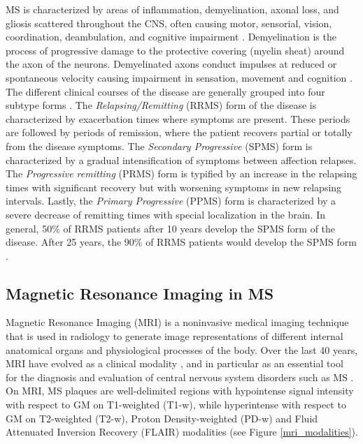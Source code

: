 MS is characterized by areas of inflammation, demyelination, axonal loss, and gliosis scattered throughout the CNS, often causing motor, sensorial, vision, coordination, deambulation, and cognitive impairment \cite{Compston2002}. Demyelination is the process of progressive damage to the protective covering (myelin sheat) around the axon of the neurons. Demyelinated axons conduct impulses at reduced or spontaneous velocity causing impairment in sensation, movement and cognition \cite{Compston2008}. The different clinical courses of the disease are generally grouped into four subtype forms \cite{Lublin1996}. The  \textit{Relapsing/Remitting} (RRMS) form of the disease is characterized by exacerbation times where symptoms are present. These periods are followed by periods of remission, where the patient recovers partial or totally from the disease symptoms. The \textit{Secondary Progressive} (SPMS) form is characterized by a gradual intensification of symptoms between affection relapses. The \textit{Progressive remitting} (PRMS) form is typified by an increase in the relapsing times with significant recovery but with worsening symptoms in new relapsing intervals. Lastly, the \textit{Primary Progressive} (PPMS) form is characterized by a severe decrease of remitting times with special localization in the brain. In general, 50\% of RRMS patients after 10 years develop the SPMS form of the disease. After 25 years, the 90\% of RRMS patients would develop the SPMS form \cite{Lublin1996}.


\subsection{Magnetic Resonance Imaging in MS}
\label{subsec:introduction_magnetic_resonance_imaging}
Magnetic Resonance Imaging (MRI) is a noninvasive medical imaging technique that is used in radiology to generate image representations of different internal anatomical organs and physiological processes of the body. Over the last 40 years, MRI have evolved as a clinical modality \cite{Geva2006}, and in particular as an essential tool for the diagnosis and evaluation of central nervous system disorders such as MS \cite{Edelman1993}. On MRI, MS plaques are well-delimited regions with hypointense signal intensity with respect to GM on T1-weighted (T1-w), while hyperintense with respect to GM on T2-weighted (T2-w), Proton Density-weighted (PD-w) and Fluid Attenuated Inversion Recovery (FLAIR) modalities (see Figure \ref{mri_modalities}).

